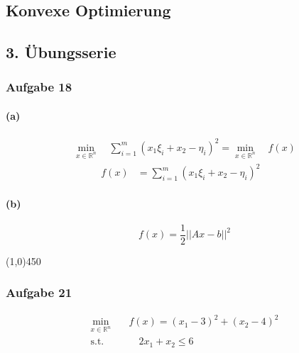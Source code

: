 \documentclass{article}
\newcommand{\hr}{\begin{center} \line(1,0){450} \end{center}}
\begin{document}
\begin{center}
    \section*{Konvexe Optimierung}
    \subsection*{3. Übungsserie}
\end{center}

\subsubsection*{Aufgabe 18}
\paragraph{(a)}
\begin{equation*}
    \begin{aligned}
       \min\limits_{x \in \mathbb{R}^n} \quad \sum\limits_{i = 1}^m \left( x_1\xi_i + x_2 -\eta_i \right)^2 = \min\limits_{x \in \mathbb{R}^n} \quad f(x)
    \end{aligned}
\end{equation*}
\begin{equation*}
    \begin{aligned}
    f(x) &= \sum\limits_{i = 1}^m \left( x_1\xi_i + x_2 -\eta_i \right)^2
    & 
    \end{aligned}
\end{equation*}



\paragraph{(b)}
\begin{equation*}
    f(x)=\frac{1}{2} \vert \vert Ax -b \vert \vert^2
\end{equation*}
\hr
\subsubsection*{Aufgabe 21}

\begin{equation*}
    \begin{split}
     \min\limits_{x \in \mathbb{R}^n} &\quad f(x) = (x_1 - 3)^2 + (x_2 -4)^2\\
    \text{s.t.} &\quad \quad 2x_1 + x_2 \leq 6  
\end{split}
\end{equation*}
\end{document}
